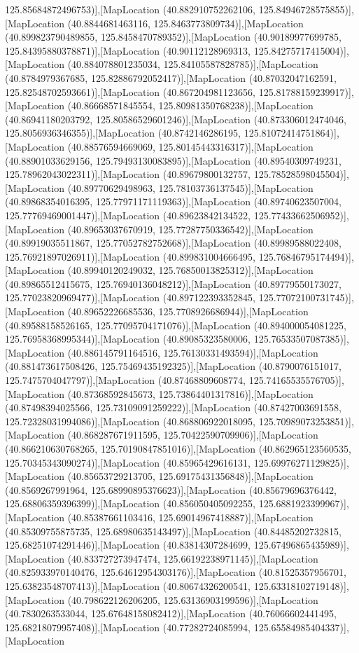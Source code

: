125.85684872496753)],[MapLocation (40.882910752262106, 125.84946728575855)],[MapLocation (40.8844681463116, 125.8463773809734)],[MapLocation (40.899823790489855, 125.8458470789352)],[MapLocation (40.90189977699785, 125.84395880378871)],[MapLocation (40.90112128969313, 125.84275717415004)],[MapLocation (40.884078801235034, 125.84105587828785)],[MapLocation (40.8784979367685, 125.82886792052417)],[MapLocation (40.87032047162591, 125.82548702593661)],[MapLocation (40.867204981123656, 125.81788159239917)],[MapLocation (40.86668571845554, 125.80981350768238)],[MapLocation (40.86941180203792, 125.80586529601246)],[MapLocation (40.873306012474046, 125.8056936346355)],[MapLocation (40.8742146286195, 125.81072414751864)],[MapLocation (40.88576594669069, 125.80145443316317)],[MapLocation (40.88901033629156, 125.79493130083895)],[MapLocation (40.89540309749231, 125.78962043022311)],[MapLocation (40.89679800132757, 125.78528598045504)],[MapLocation (40.89770629498963, 125.78103736137545)],[MapLocation (40.89868354016395, 125.77971171119363)],[MapLocation (40.89740623507004, 125.77769469001447)],[MapLocation (40.89623842134522, 125.77433662506952)],[MapLocation (40.89653037670919, 125.77287750336542)],[MapLocation (40.89919035511867, 125.77052782752668)],[MapLocation (40.89989588022408, 125.76921897026911)],[MapLocation (40.899831004666495, 125.76846795174494)],[MapLocation (40.89940120249032, 125.76850013825312)],[MapLocation (40.89865512415675, 125.76940136048212)],[MapLocation (40.89779550173027, 125.77023820969477)],[MapLocation (40.897122393352845, 125.77072100731745)],[MapLocation (40.89652226685536, 125.7708926686944)],[MapLocation (40.89588158526165, 125.77095704171076)],[MapLocation (40.894000054081225, 125.76958368995344)],[MapLocation (40.89085323580006, 125.76533507087385)],[MapLocation (40.886145791164516, 125.76130331493594)],[MapLocation (40.881473617508426, 125.75469435192325)],[MapLocation (40.8790076151017, 125.7475704047797)],[MapLocation (40.87468809608774, 125.74165535576705)],[MapLocation (40.87368592845673, 125.73864401317816)],[MapLocation (40.87498394025566, 125.73109091259222)],[MapLocation (40.87427003691558, 125.72328031994086)],[MapLocation (40.868806922018095, 125.70989073253851)],[MapLocation (40.868287671911595, 125.70422590709906)],[MapLocation (40.866210630768265, 125.70190847851016)],[MapLocation (40.862965123560535, 125.70345343090274)],[MapLocation (40.85965429616131, 125.69976271129825)],[MapLocation (40.85653729213705, 125.69175431356848)],[MapLocation (40.8569267991964, 125.68990895376623)],[MapLocation (40.85679696376442, 125.68806359396399)],[MapLocation (40.856050405092255, 125.6881923399967)],[MapLocation (40.85387661103416, 125.69014967418887)],[MapLocation (40.85309755875735, 125.68980635143497)],[MapLocation (40.84485202732815, 125.68251074291446)],[MapLocation (40.83814307284699, 125.67496865435989)],[MapLocation (40.833727273947474, 125.66192238971145)],[MapLocation (40.825933970140476, 125.64612954303176)],[MapLocation (40.81525357956701, 125.63823548707413)],[MapLocation (40.80674326200541, 125.63318102719148)],[MapLocation (40.798622126206205, 125.63136903199596)],[MapLocation (40.7830263533044, 125.67648158082412)],[MapLocation (40.76066602441495, 125.68218079957408)],[MapLocation (40.77282724085994, 125.65584985404337)],[MapLocation 